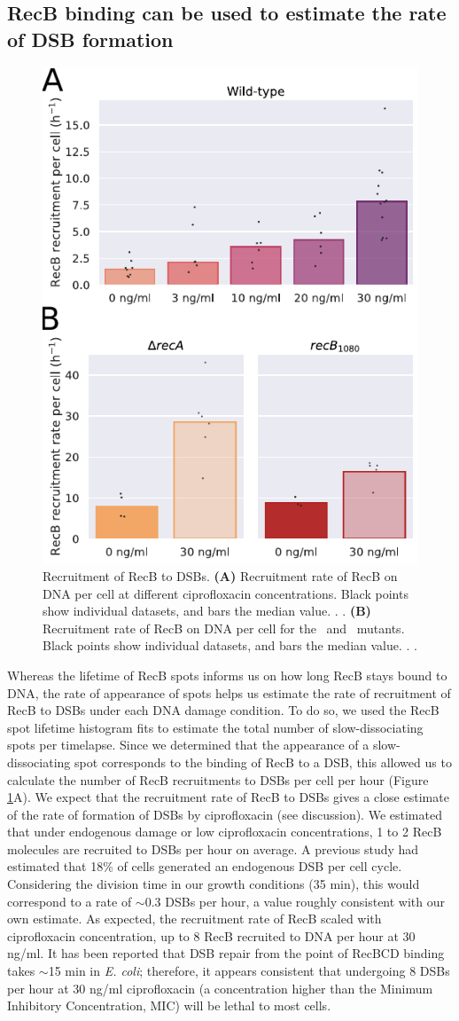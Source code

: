 \subsection*{RecB binding can be used to estimate the rate of DSB formation}

\begin{figure}[htbp]
    \centering
    \includegraphics[width=.4\textwidth]{Figures/Fig3_RecB_recruitment.pdf}
    \caption{Recruitment of RecB to DSBs. \textbf{(A)} Recruitment rate of RecB on DNA per cell at different ciprofloxacin concentrations. Black points show individual datasets, and bars the median value. . . \textbf{(B)} Recruitment rate of RecB on DNA per cell for the \dreca\ and \geneteneighty\ mutants. Black points show individual datasets, and bars the median value. . .}
    \label{Fig:recruitment}
\end{figure}

Whereas the lifetime of RecB spots informs us on how long RecB stays bound to DNA, the rate of appearance of spots helps us estimate the rate of recruitment of RecB to DSBs under each DNA damage condition. To do so, we used the RecB spot lifetime histogram fits to estimate the total number of slow-dissociating spots per timelapse. Since we determined that the appearance of a slow-dissociating spot corresponds to the binding of RecB to a DSB, this allowed us to calculate the number of RecB recruitments to DSBs per cell per hour (Figure \ref{Fig:recruitment}A). We expect that the recruitment rate of RecB to DSBs gives a close estimate of the rate of formation of DSBs by ciprofloxacin (see discussion). We estimated that under endogenous damage or low ciprofloxacin concentrations, 1 to 2 RecB molecules are recruited to DSBs per hour on average. A previous study had estimated that 18\% of cells generated an endogenous DSB per cell cycle\cite{Sinha2018}. Considering the division time in our growth conditions (35 min), this would correspond to a rate of $\sim$0.3 DSBs per hour, a value roughly consistent with our own estimate. As expected, the recruitment rate of RecB scaled with ciprofloxacin concentration, up to 8 RecB recruited to DNA per hour at 30 ng/ml. It has been reported that DSB repair from the point of RecBCD binding takes $\sim$15 min in \emph{E. coli}\cite{Wiktor2021}; therefore, it appears consistent that undergoing 8 DSBs per hour at 30 ng/ml ciprofloxacin (a concentration higher than the Minimum Inhibitory Concentration, MIC) will be lethal to most cells.

